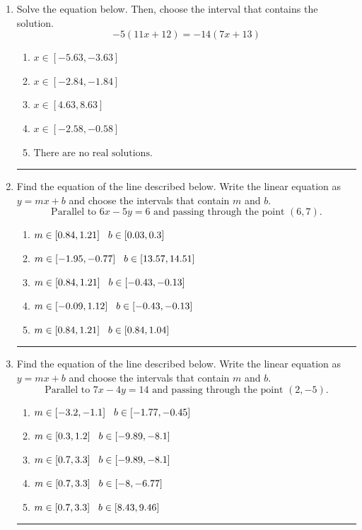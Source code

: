 \documentclass[14pt]{extbook}
\newcommand{\litem}[1]{\item#1\hspace*{-1cm}\rule{\textwidth}{0.4pt}}
\begin{document}
\begin{enumerate}
\litem{
Solve the equation below. Then, choose the interval that contains the solution.\[ -5(11x + 12) = -14(7x + 13) \]\begin{enumerate}[label=\Alph*.]
\item \( x \in [-5.63, -3.63] \)
\item \( x \in [-2.84, -1.84] \)
\item \( x \in [4.63, 8.63] \)
\item \( x \in [-2.58, -0.58] \)
\item \( \text{There are no real solutions.} \)

\end{enumerate} }
\litem{
Find the equation of the line described below. Write the linear equation as $ y=mx+b $ and choose the intervals that contain $m$ and $b$.\[ \text{Parallel to } 6 x - 5 y = 6 \text{ and passing through the point } (6, 7). \]\begin{enumerate}[label=\Alph*.]
\item \( m \in [0.84, 1.21] \hspace*{3mm} b \in [0.03, 0.3] \)
\item \( m \in [-1.95, -0.77] \hspace*{3mm} b \in [13.57, 14.51] \)
\item \( m \in [0.84, 1.21] \hspace*{3mm} b \in [-0.43, -0.13] \)
\item \( m \in [-0.09, 1.12] \hspace*{3mm} b \in [-0.43, -0.13] \)
\item \( m \in [0.84, 1.21] \hspace*{3mm} b \in [0.84, 1.04] \)

\end{enumerate} }
\litem{
Find the equation of the line described below. Write the linear equation as $ y=mx+b $ and choose the intervals that contain $m$ and $b$.\[ \text{Parallel to } 7 x - 4 y = 14 \text{ and passing through the point } (2, -5). \]\begin{enumerate}[label=\Alph*.]
\item \( m \in [-3.2, -1.1] \hspace*{3mm} b \in [-1.77, -0.45] \)
\item \( m \in [0.3, 1.2] \hspace*{3mm} b \in [-9.89, -8.1] \)
\item \( m \in [0.7, 3.3] \hspace*{3mm} b \in [-9.89, -8.1] \)
\item \( m \in [0.7, 3.3] \hspace*{3mm} b \in [-8, -6.77] \)
\item \( m \in [0.7, 3.3] \hspace*{3mm} b \in [8.43, 9.46] \)


\end{enumerate}}
\end{enumerate}
\end{document}
